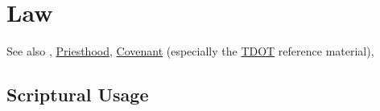 \section{Law}
	\label{LAW}
	
	See also \hyperref[ANOMIA]{}, \hyperref[PRIESTHOOD]{Priesthood}, \hyperref[COVENANT]{Covenant} (especially the \hyperref[COVENANT-TDOT]{TDOT} reference material),
	





\subsection{Scriptural Usage} %
	\label{LAW-SCRIPTURES}

	
	
